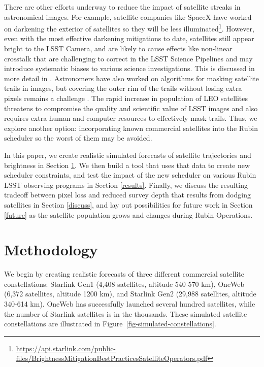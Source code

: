 \documentclass[linenumbers]{aastex631}
\begin{document}
There are other efforts underway to reduce the impact of satellite streaks in astronomical images. For example, satellite companies like SpaceX have worked on darkening the exterior of satellites so they will be less illuminated\footnote{\url{https://api.starlink.com/public-files/BrightnessMitigationBestPracticesSatelliteOperators.pdf}}. However, even with the most effective darkening mitigations to date, satellites still appear bright to the LSST Camera, and are likely to cause effects like non-linear crosstalk that are challenging to correct in the LSST Science Pipelines and may introduce systematic biases to various science investigations. This is discussed in more detail in \citet{tyson20}. Astronomers have also worked on algorithms for masking satellite trails in images, but covering the outer rim of the trails without losing extra pixels remains a challenge \citep{hasan22}. The rapid increase in population of LEO satellites threatens to compromise the quality and scientific value of LSST images and also requires extra human and computer resources to effectively mask trails. Thus, we explore another option: incorporating known commercial satellites into the Rubin scheduler so the worst of them may be avoided.

In this paper, we create realistic simulated forecasts of satellite trajectories and brightness in Section \ref{method}. We then build a tool that uses that data to create new scheduler constraints, and test the impact of the new scheduler on various Rubin LSST observing programs in Section \ref{results}. Finally, we discuss the resulting tradeoff between pixel loss and reduced survey depth that results from dodging satellites in Section \ref{discuss}, and lay out possibilities for future work in Section \ref{future} as the satellite population grows and changes during Rubin Operations.

\section{Methodology}\label{method}

We begin by creating realistic forecasts of three different commercial satellite constellations: Starlink Gen1 (4,408 satellites, altitude 540-570 km), OneWeb (6,372 satellites, altitude 1200 km), and Starlink Gen2 (29,988 satellites, altitude 340-614 km). OneWeb has successfully launched several hundred satellites, while the number of Starlink satellites is in the thousands. These simulated satellite constellations are illustrated in Figure~\ref{fig-simulated-constellations}. 
\end{document}
